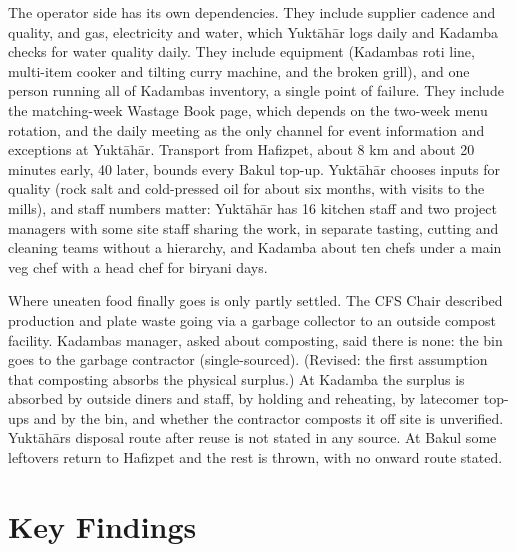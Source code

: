 \documentclass[
  10pt,
  table]{article}
\newcounter{none} %
\begin{document}
The operator side has its own dependencies. They include supplier cadence and quality, and gas, electricity and water, which Yuktāhār logs daily and Kadamba checks for water quality daily. They include equipment (Kadamba\textquotesingle s roti line, multi-item cooker and tilting curry machine, and the broken grill), and one person running all of Kadamba\textquotesingle s inventory, a single point of failure. They include the matching-week Wastage Book page, which depends on the two-week menu rotation, and the daily meeting as the only channel for event information and exceptions at Yuktāhār. Transport from Hafizpet, about 8 km and about 20 minutes early, 40 later, bounds every Bakul top-up. Yuktāhār chooses inputs for quality (rock salt and cold-pressed oil for about six months, with visits to the mills), and staff numbers matter: Yuktāhār has 16 kitchen staff and two project managers with some site staff sharing the work, in separate tasting, cutting and cleaning teams without a hierarchy, and Kadamba about ten chefs under a main veg chef with a head chef for biryani days.

Where uneaten food finally goes is only partly settled. The CFS Chair described production and plate waste going via a garbage collector to an outside compost facility. Kadamba\textquotesingle s manager, asked about composting, said there is none: the bin goes to the garbage contractor (single-sourced). (Revised: the first assumption that composting absorbs the physical surplus.) At Kadamba the surplus is absorbed by outside diners and staff, by holding and reheating, by latecomer top-ups and by the bin, and whether the contractor composts it off site is unverified. Yuktāhār\textquotesingle s disposal route after reuse is not stated in any source. At Bakul some leftovers return to Hafizpet and the rest is thrown, with no onward route stated.

\section{Key Findings}\label{key-findings}
\end{document}
